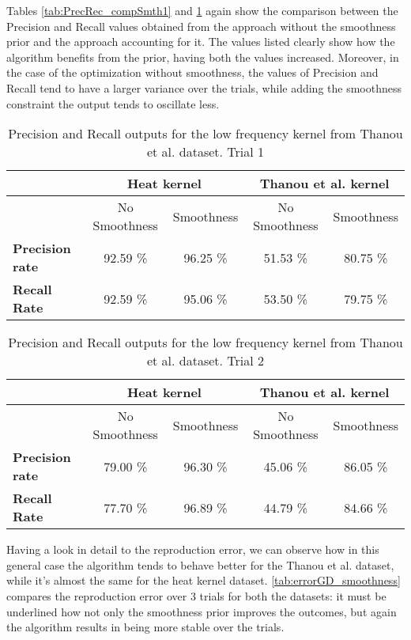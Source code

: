 Tables \ref{tab:PrecRec_compSmth1} and \ref{tab:PrecRec_compSmth2} again show the comparison between the Precision and Recall values obtained from the approach without the smoothness prior and the approach accounting for it. The values listed clearly show how the algorithm benefits from the prior, having both the values increased. Moreover, in the case of the optimization without smoothness, the values of Precision and Recall tend to have a larger variance over the trials, while adding the smoothness constraint the output tends to oscillate less.

\begin{table}[htbp]
  \centering
  \begin{tabular}{lcccc}
  &\multicolumn{2}{c}{\textbf{Heat kernel}}&\multicolumn{2}{c}{\textbf{Thanou et al. kernel}}\\
  \toprule
  &No Smoothness & Smoothness & No Smoothness & Smoothness\\
  \midrule
    \textbf{Precision rate} & 92.59 \% & 96.25 \% & 51.53 \% & 80.75   \%\\
    \textbf{Recall Rate} & 92.59 \% & 95.06 \% & 53.50 \% & 79.75 \%\\
  \bottomrule
  \end{tabular}
 \caption{Precision and Recall outputs for the low frequency kernel from Thanou et al. dataset. Trial 1}
 \label{tab:PrecRec_compSmth2}
 \end{table}

 \begin{table}[htbp]
   \centering
   \begin{tabular}{lcccc}
   &\multicolumn{2}{c}{\textbf{Heat kernel}}&\multicolumn{2}{c}{\textbf{Thanou et al. kernel}}\\
   \toprule
   &No Smoothness & Smoothness & No Smoothness & Smoothness\\
   \midrule
    \textbf{Precision rate} & 79.00 \% & 96.30 \% & 45.06 \% & 86.05  \%\\
    \textbf{Recall Rate} & 77.70 \% & 96.89 \% & 44.79 \% & 84.66 \%\\
    \bottomrule
    \end{tabular}
   \caption{Precision and Recall outputs for the low frequency kernel from Thanou et al. dataset. Trial 2}
   \end{table}

Having a look in detail to the reproduction error, we can observe how in this general case the algorithm tends to behave better for the Thanou et al. dataset, while it's almost the same for the heat kernel dataset. \autoref{tab:errorGD_smoothness} compares the reproduction error over $3$ trials for both the datasets: it must be underlined how not only the smoothness prior improves the outcomes, but again the algorithm results in being more stable over the trials.

